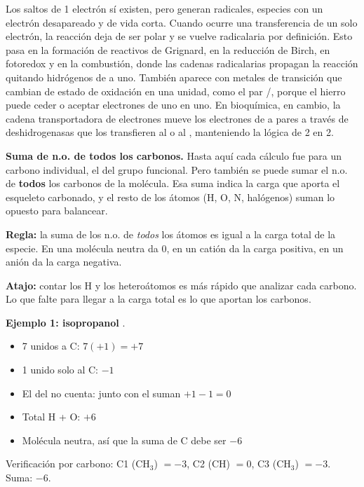 \begin{enumerate}
    Los saltos de 1 electrón sí existen, pero generan radicales, especies 
    con un electrón desapareado y de vida corta. Cuando ocurre una 
    transferencia de un solo electrón, la reacción deja de ser polar y se 
    vuelve radicalaria por definición. Esto pasa en la formación de 
    reactivos de Grignard, en la reducción de Birch, en fotoredox y en la 
    combustión, donde las cadenas radicalarias propagan la reacción 
    quitando hidrógenos de a uno. También aparece con metales de transición 
    que cambian de estado de oxidación en una unidad, como el par 
    /, porque el hierro 
    puede ceder o aceptar electrones de uno en uno. En bioquímica, en 
    cambio, la cadena transportadora de electrones mueve los electrones de 
    a pares a través de deshidrogenasas que los transfieren al  
    o al , manteniendo la lógica de 2 en 2.
\end{enumerate}

\textbf{Suma de n.o. de todos los carbonos.} Hasta aquí cada cálculo fue 
para un carbono individual, el del grupo funcional. Pero también se puede 
sumar el n.o. de \textbf{todos} los carbonos de la molécula. Esa suma 
indica la carga que aporta el esqueleto carbonado, y el resto de los 
átomos (H, O, N, halógenos) suman lo opuesto para balancear.

\textbf{Regla:} la suma de los n.o. de \emph{todos} los átomos es igual a 
la carga total de la especie. En una molécula neutra da $0$, en un catión 
da la carga positiva, en un anión da la carga negativa.

\textbf{Atajo:} contar los H y los heteroátomos es más rápido que analizar 
cada carbono. Lo que falte para llegar a la carga total es lo que aportan 
los carbonos.

\textbf{Ejemplo 1: isopropanol} .

\begin{itemize}
    \item 7  unidos a C: $7(+1) = +7$
    \item 1  unido solo al C: $-1$
    \item El  del  no cuenta: junto con el  suman $+1 - 1 = 0$
    \item Total H + O: $+6$
    \item Molécula neutra, así que la suma de C debe ser $-6$
\end{itemize}

Verificación por carbono: C1 (CH$_3$) $= -3$, C2 (CH) $= 0$, C3 (CH$_3$) $= -3$. Suma: $-6$.

